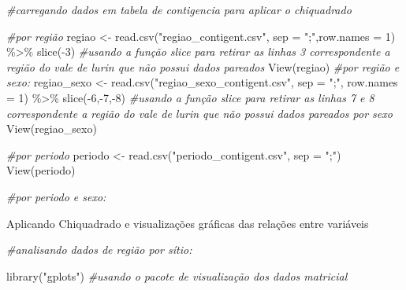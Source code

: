 \documentclass[
]{article}
\newenvironment{Shaded}{\begin{snugshade}}{\end{snugshade}}
\newcommand{\AttributeTok}[1]{\textcolor[rgb]{0.77,0.63,0.00}{#1}}
\newcommand{\CommentTok}[1]{\textcolor[rgb]{0.56,0.35,0.01}{\textit{#1}}}
\newcommand{\DecValTok}[1]{\textcolor[rgb]{0.00,0.00,0.81}{#1}}
\newcommand{\FunctionTok}[1]{\textcolor[rgb]{0.00,0.00,0.00}{#1}}
\newcommand{\NormalTok}[1]{#1}
\newcommand{\OtherTok}[1]{\textcolor[rgb]{0.56,0.35,0.01}{#1}}
\newcommand{\SpecialCharTok}[1]{\textcolor[rgb]{0.00,0.00,0.00}{#1}}
\newcommand{\StringTok}[1]{\textcolor[rgb]{0.31,0.60,0.02}{#1}}
\begin{document}
\begin{Shaded}
\begin{Highlighting}[]
\CommentTok{\#carregando dados em tabela de contigencia para aplicar o chiquadrado}

\CommentTok{\#por região}
\NormalTok{regiao }\OtherTok{\textless{}{-}} \FunctionTok{read.csv}\NormalTok{(}\StringTok{"regiao\_contigent.csv"}\NormalTok{, }\AttributeTok{sep =} \StringTok{";"}\NormalTok{,}\AttributeTok{row.names =} \DecValTok{1}\NormalTok{) }\SpecialCharTok{\%\textgreater{}\%} \FunctionTok{slice}\NormalTok{(}\SpecialCharTok{{-}}\DecValTok{3}\NormalTok{)  }\CommentTok{\#usando a função slice para retirar as linhas 3 correspondente a região do vale de lurin que não possui dados pareados }
\FunctionTok{View}\NormalTok{(regiao)}
\CommentTok{\#por região e sexo:}
\NormalTok{regiao\_sexo }\OtherTok{\textless{}{-}} \FunctionTok{read.csv}\NormalTok{(}\StringTok{"regiao\_sexo\_contigent.csv"}\NormalTok{, }\AttributeTok{sep =} \StringTok{";"}\NormalTok{, }\AttributeTok{row.names =} \DecValTok{1}\NormalTok{) }\SpecialCharTok{\%\textgreater{}\%} \FunctionTok{slice}\NormalTok{(}\SpecialCharTok{{-}}\DecValTok{6}\NormalTok{,}\SpecialCharTok{{-}}\DecValTok{7}\NormalTok{,}\SpecialCharTok{{-}}\DecValTok{8}\NormalTok{) }\CommentTok{\#usando a função slice para retirar as linhas 7 e 8 correspondente a região do vale de lurin que não possui dados pareados por sexo}
\FunctionTok{View}\NormalTok{(regiao\_sexo)}

\CommentTok{\#por periodo}
\NormalTok{periodo }\OtherTok{\textless{}{-}} \FunctionTok{read.csv}\NormalTok{(}\StringTok{"periodo\_contigent.csv"}\NormalTok{, }\AttributeTok{sep =} \StringTok{";"}\NormalTok{)}
\FunctionTok{View}\NormalTok{(periodo)}

\CommentTok{\#por periodo e sexo:}
\end{Highlighting}
\end{Shaded}

Aplicando Chiquadrado e visualizações gráficas das relações entre
variáveis

\begin{Shaded}
\begin{Highlighting}[]
\CommentTok{\#analisando dados de região por sítio:}

\FunctionTok{library}\NormalTok{(}\StringTok{"gplots"}\NormalTok{) }\CommentTok{\#usando o pacote de visualização dos dados matricial}
\end{Highlighting}
\end{Shaded}
\end{document}
